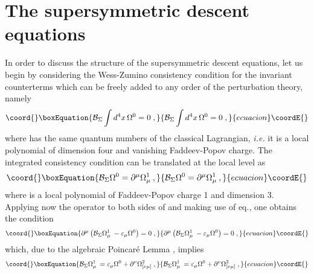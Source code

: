 \documentclass[a4paper,12pt]{article}
\begin{document}
\section{The supersymmetric descent equations}

In order to discuss the structure of the supersymmetric descent equations,
let us begin by considering the Wess-Zumino consistency condition for the
invariant counterterms which can be freely added to any order of the
perturbation theory, namely 
\begin{equation}\coord{}\boxEquation{
\mathcal{B}_{\Sigma }\int d^{4}x\,\Omega ^{0}=0\;,  \label{w-z}
}{
\mathcal{B}_{\Sigma }\int d^{4}x\,\Omega ^{0}=0\;,  }{ecuacion}\coordE{}\end{equation}
where \coordHE{} has the same quantum numbers of the classical
Lagrangian, \textit{i.e.} it is a local polynomial of dimension four and
vanishing Faddeev-Popov charge. The integrated consistency condition \myHighlight{$\left( 
\ref{w-z}\right) $}\coordHE{} can be translated at the local level as 
\begin{equation}\coord{}\boxEquation{
\mathcal{B}_{\Sigma }\Omega ^{0}=\partial ^{\mu }\Omega _{\mu \;}^{1},
\label{1-l}
}{
\mathcal{B}_{\Sigma }\Omega ^{0}=\partial ^{\mu }\Omega _{\mu \;}^{1},
}{ecuacion}\coordE{}\end{equation}
where \coordHE{}is a local polynomial of Faddeev-Popov charge 1
and dimension 3. Applying now the operator \coordHE{} to both
sides of \myHighlight{$\left( \ref{1-l}\right) $}\coordHE{} and making use of eq.\myHighlight{$\left( \ref{stonil}%
\right) $}\coordHE{}, one obtains the condition 
\begin{equation}\coord{}\boxEquation{
\partial ^{\mu }\left( \mathcal{B}_{\Sigma }\Omega _{\mu \;}^{1}-\varepsilon
_{\mu }\Omega ^{0}\right) =0\;,  \label{l-2}
}{
\partial ^{\mu }\left( \mathcal{B}_{\Sigma }\Omega _{\mu \;}^{1}-\varepsilon
_{\mu }\Omega ^{0}\right) =0\;,  }{ecuacion}\coordE{}\end{equation}
which, due to the algebraic Poincar\'{e} Lemma \cite{book}, implies 
\begin{equation}\coord{}\boxEquation{
\mathcal{B}_{\Sigma }\Omega _{\mu \;}^{1}=\varepsilon _{\mu }\Omega
^{0}+\partial ^{\nu }\Omega _{[\nu \mu ]}^{2}\;,  \label{l-3}
}{
\mathcal{B}_{\Sigma }\Omega _{\mu \;}^{1}=\varepsilon _{\mu }\Omega
^{0}+\partial ^{\nu }\Omega _{[\nu \mu ]}^{2}\;,  }{ecuacion}\coordE{}\end{equation}
\end{document}
